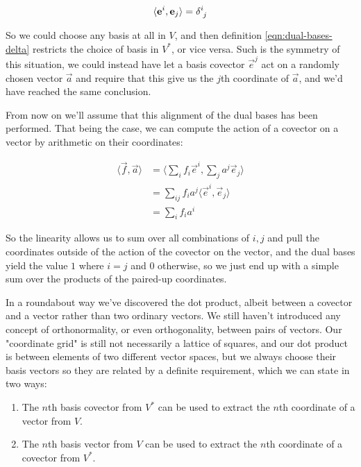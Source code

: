 \begin{equation}
    \langle \vec{e}^i,\vec{e}_j\rangle = \delta\indices{^i_j}
    \label{eqn:dual-bases-delta}
\end{equation}

So we could choose any basis at all in $V$, and then definition \eqref{eqn:dual-bases-delta} restricts the choice of basis in $V^*$, or vice versa. Such is the symmetry of this situation, we could instead have let a basis covector $\vec{e}^j$ act on a randomly chosen vector $\vec{a}$ and require that this give us the $j$th coordinate of $\vec{a}$, and we'd have reached the same conclusion.

From now on we'll assume that this alignment of the dual bases has been performed. That being the case, we can compute the action of a covector on a vector by arithmetic on their coordinates:

\begin{equation}
    \begin{split}
        \langle \vec{f},\vec{a}\rangle 
        &= \langle \sum_i f_i \vec{e}^i , \sum_j a^j \vec{e}_j \rangle \\
        &= \sum_{ij} f_i a^j \langle\vec{e}^i,\vec{e}_j\rangle \\
        &= \sum_{i} f_i a^i
    \end{split}
\end{equation}

So the linearity allows us to sum over all combinations of $i, j$ and pull the coordinates outside of the action of the covector on the vector, and the dual bases yield the value $1$ where $i = j$ and $0$ otherwise, so we just end up with a simple sum over the products of the paired-up coordinates.

In a roundabout way we've discovered the dot product, albeit between a covector and a vector rather than two ordinary vectors. We still haven't introduced any concept of orthonormality, or even orthogonality, between pairs of vectors. Our "coordinate grid" is still not necessarily a lattice of squares, and our dot product is between elements of two different vector spaces, but we always choose their basis vectors so they are related by a definite requirement, which we can state in two ways:

\begin{enumerate}
    \item The $n$th basis covector from $V^*$ can be used to extract the $n$th coordinate of a vector from $V$.
    \item The $n$th basis vector from $V$ can be used to extract the $n$th coordinate of a covector from $V^*$.
\end{enumerate}

